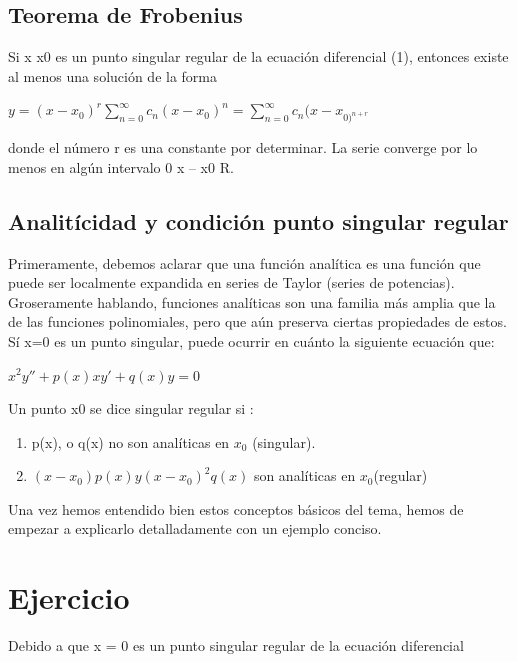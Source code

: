 \documentclass{article}
\begin{document}
\subsection{Teorema de Frobenius}
\large Si x  x0 es un punto singular regular de la ecuación diferencial (1), entonces existe al menos una solución de la forma\newline

\begin{center}
\Large$ y = (x - x_{0})^{r}$$\sum_{n=0}^{\infty}$$c_{n} (x - x_{0}) ^{n} =  $$\sum_{n=0}^{\infty}$$c_{n} ( x - x_{0)^{n+r}}$
\end{center}

\large donde el número r es una constante por determinar. La serie converge por lo menos en algún intervalo 0 \< x – x0 \< R.\newpage

\subsection{Analitícidad y condición punto singular regular}
\large Primeramente, debemos aclarar que una función analítica es una función que puede ser localmente expandida en series de Taylor (series de potencias). Groseramente hablando, funciones analíticas son una familia más amplia que la de las funciones polinomiales, pero que aún preserva ciertas propiedades de estos.\newline
\large Sí x=0 es un punto singular, puede ocurrir en cuánto la siguiente ecuación que:\newline

\begin{center}
\Large$x^{2}y'' + p(x)xy' + q(x)y = 0 $
\end{center}

\large Un punto x0 se dice singular regular si :

\begin{enumerate}
\item  p(x), o q(x) no son analíticas en $x_{0}$ (singular).
\item  $(x - x_{0}) p(x)$\hspace{0.1cm}$ y$\hspace{0.1cm}$ (x - x_{0})^{2} q(x)$ son analíticas en $x_{0}$(regular)
\end{enumerate}

\large Una vez hemos entendido bien estos conceptos básicos del tema, hemos de empezar a explicarlo detalladamente con un ejemplo conciso.

\section{Ejercicio}
\large Debido a que x = 0 es un punto singular regular de la ecuación diferencial
\end{document}
